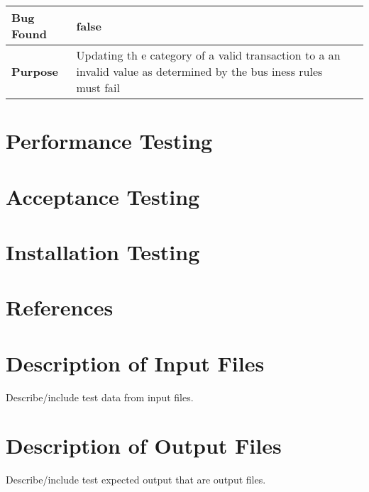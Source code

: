 \documentclass[12pt]{article}
\begin{document}
\begin{longtable}{|m{4cm}|l|l|l|}
\cellcolor[HTML]{C0C0C0}\textbf{Bug Found} & \multicolumn{2}{p{13cm}|}{false}\\
\hline
\cellcolor[HTML]{C0C0C0}\textbf{Purpose} & \multicolumn{2}{p{13cm}|}{Updating th
e category of a valid transaction to a an invalid value as determined by the bus
iness rules must fail}\\ \hline
\end{longtable}

\section{Performance Testing}
\section{Acceptance Testing}
\section{Installation Testing}

\section{References}

\appendix

\section{Description of Input Files}

Describe/include test data from input files.

\section{Description of Output Files}

Describe/include test expected output that are output files.
\end{document}
